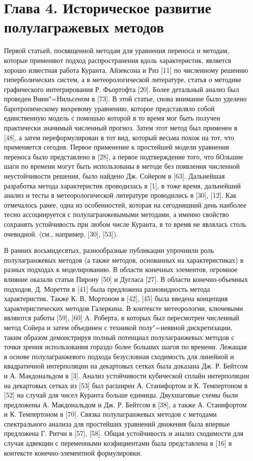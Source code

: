 \chapter*{Глава 4. Историческое развитие полулагражевых методов} \label{chapt_4}
Первой статьей, посвященной методам для уравнения переноса и методам, которые применяют подход распространения вдоль характеристик, является хорошо известная работа Куранта, Айзексона и Риз [11] по численному решению гиперболических систем, а в метеорологической литературе, статья о методике графического интегрирования Р. Фьортофта [20]. Более детальный анализ был проведен Виин"=Нильсеном в [73]. В этой статье, снова внимание было уделено баротропическому вихревому уравнению, которое представляло собой единственную модель с помошью которой в то время мог быть получен практически значимый численный прогноз. Затем этот метод был применен в [48], а затем переформулирован в тот вид, который весьма похож на тот, что применяется сегодня. Первое применение к простейшей модели уравнения переноса было представлено в [28], а первое подтверждение того, что бОльшие шаги по времени могут быть использованы в методе без появления численной неустойчивости решения, было найдено Дж. Сойером в [63]. Дальнейшая разработка метода характеристик проводилась в [1], в тоже время, дальнейший анализ и тесты в метеорологической литературе проводились в [30], [12]. Как отмечалось ранее, одна из особенностей, которая на сегодняшний день наиболее тесно ассоциируется с полулагранжевымыми методами, а именно свойство сохранять устойчивость при любом числе Куранта, в то время не являлась столь очевидной. (см., например, [30], [53]).

В ранних восьмидесятых, разнообразные публикации упрочнили роль полулагранжевых методов (а также методов, основанных на характеристиках) в разных подходах к моделированию. В области конечных элементов, огромное влияние оказали статьи Пирону [50] и Дугласа [27]. В области конечно-объемных подходов, Д. Моретти в [41] была предложена разновидность метода характеристик. Также К. В. Мортоном в [42], [45] была введена концепция характеристических методов Галеркина. В контексте метеорологии, ключевыми являются работы [59], [60] A. Роберта, в которых был пересмотрен численный метод Сойера и затем объединен с техникой полу"=неявной дискретизации, таким образом демонстрируя полный потенциал полулагранжевых методов с точки зрения использования гораздо более больших шагов по времени. Лежащая в основе полулагранжевого подхода безусловная сходимость для линейной и квадратичной интерполяции на декартовых сетках была доказана Дж. Р. Бейтсом и А. Макдональдом в [3]. Анализ устойчивости кубической сплайн интерполяции на декартовых сетках из [53] был расширен А. Станифортом и К. Темпертоном в [52] на случай для чисел Куранта больше единицы. Двухшаговые схемы были предложены А. Макдональдом и Дж. Р. Бейтсом в [38], а также А. Станифортом и К. Темпертоном в [70]. Связка полулагранжевых методов с методами спектрального анализа для простейших уравнений движения была впервые предложена Г. Ритчи в [57], [58]. Общая устойчивость и анализ сходимости для случая адвекции с переменными коэфициентами была представлена в [16] в контексте конечно-элементной формулировки.

